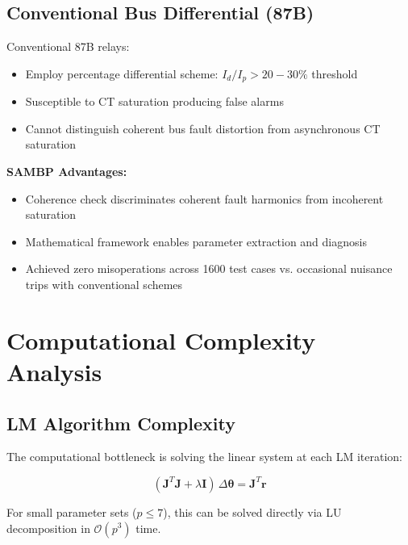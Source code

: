 \documentclass[12pt,a4paper]{article}
\newcommand{\deltatheta}{\Delta\boldsymbol{\theta}}
\newcommand{\key}[1]{\textbf{\textcolor{blue!70!black}{#1}}}
\begin{document}
\subsection{Conventional Bus Differential (87B)}
\label{subsec:comp_87b}

Conventional 87B relays:
\begin{itemize}
    \item Employ percentage differential scheme: $I_d / I_p > 20-30\%$ threshold
    \item Susceptible to CT saturation producing false alarms
    \item Cannot distinguish coherent bus fault distortion from asynchronous CT saturation
\end{itemize}

\key{SAMBP Advantages:}
\begin{itemize}
    \item Coherence check discriminates coherent fault harmonics from incoherent saturation
    \item Mathematical framework enables parameter extraction and diagnosis
    \item Achieved zero misoperations across 1600 test cases vs. occasional nuisance trips 
    with conventional schemes
\end{itemize}

\section{Computational Complexity Analysis}
\label{sec:complexity}

\subsection{LM Algorithm Complexity}
\label{subsec:lm_complexity}

The computational bottleneck is solving the linear system at each LM iteration:

\begin{equation}
(\mathbf{J}^T \mathbf{J} + \lambda \mathbf{I}) \, \deltatheta = \mathbf{J}^T \mathbf{r}
\label{eq:lm_solve}
\end{equation}

For small parameter sets ($p \leq 7$), this can be solved directly via LU decomposition in $\mathcal{O}(p^3)$ time.
\end{document}
